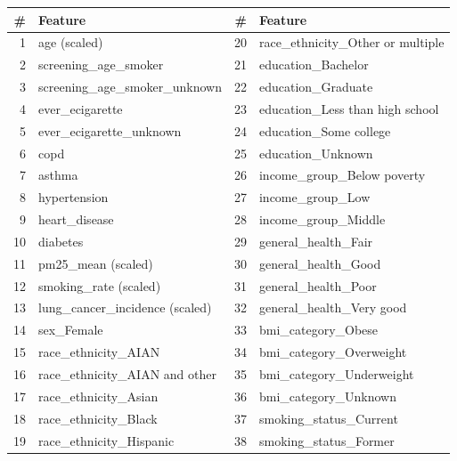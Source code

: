 \begin{tabular}{rl rl}
\toprule
\# & Feature & \# & Feature \\
\midrule
1 & age (scaled) & 20 & race\_ethnicity\_Other or multiple \\
2 & screening\_age\_smoker & 21 & education\_Bachelor \\
3 & screening\_age\_smoker\_unknown & 22 & education\_Graduate \\
4 & ever\_ecigarette & 23 & education\_Less than high school \\
5 & ever\_ecigarette\_unknown & 24 & education\_Some college \\
6 & copd & 25 & education\_Unknown \\
7 & asthma & 26 & income\_group\_Below poverty \\
8 & hypertension & 27 & income\_group\_Low \\
9 & heart\_disease & 28 & income\_group\_Middle \\
10 & diabetes & 29 & general\_health\_Fair \\
11 & pm25\_mean (scaled) & 30 & general\_health\_Good \\
12 & smoking\_rate (scaled) & 31 & general\_health\_Poor \\
13 & lung\_cancer\_incidence (scaled) & 32 & general\_health\_Very good \\
14 & sex\_Female & 33 & bmi\_category\_Obese \\
15 & race\_ethnicity\_AIAN & 34 & bmi\_category\_Overweight \\
16 & race\_ethnicity\_AIAN and other & 35 & bmi\_category\_Underweight \\
17 & race\_ethnicity\_Asian & 36 & bmi\_category\_Unknown \\
18 & race\_ethnicity\_Black & 37 & smoking\_status\_Current \\
19 & race\_ethnicity\_Hispanic & 38 & smoking\_status\_Former \\
\bottomrule
\end{tabular}
